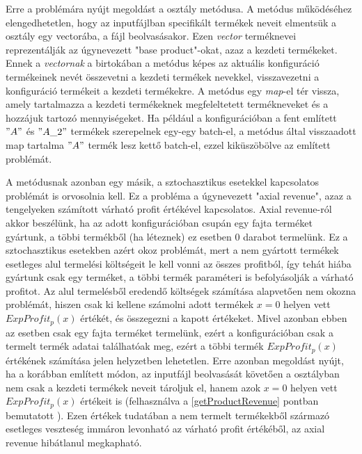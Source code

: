 Erre a problémára nyújt megoldást a  osztály  metódusa.
A metódus működéséhez elengedhetetlen, hogy az inputfájlban specifikált termékek neveit elmentsük a  osztály egy vectorába, a fájl beolvasásakor.
Ezen \textit{vector} terméknevei reprezentálják az úgynevezett "base product"-okat, azaz a kezdeti termékeket.
Ennek a \textit{vectornak} a birtokában a  metódus képes az aktuális konfiguráció termékeinek nevét összevetni a kezdeti termékek nevekkel, visszavezetni a konfiguráció termékeit a kezdeti termékekre.
A metódus egy \textit{map}-el tér vissza, amely tartalmazza a kezdeti termékeknek megfeleltetett termékneveket és a hozzájuk tartozó mennyiségeket.
Ha például a konfigurációban a fent említett $"A"$ és $"A\_2"$ termékek szerepelnek egy-egy batch-el, a metódus által visszaadott map tartalma $"A"$ termék lesz kettő batch-el, ezzel kiküszöbölve az említett problémát.

A  metódusnak azonban egy másik, a sztochasztikus esetekkel kapcsolatos problémát is orvosolnia kell.
Ez a probléma a úgynevezett "axial revenue", azaz a tengelyeken számított várható profit értékével kapcsolatos.
Axial revenue-ról akkor beszélünk, ha az adott konfigurációban csupán egy fajta terméket gyártunk, a többi termékből (ha léteznek) ez esetben 0 darabot termelünk.
Ez a sztochasztikus esetekben azért okoz problémát, mert a nem gyártott termékek esetleges alul termelési költségeit le kell vonni az összes profitból, így tehát hiába gyártunk csak egy terméket, a többi termék paraméteri is befolyásolják a várható profitot.
Az alul termelésből eredendő költségek számítása alapvetően nem okozna problémát, hiszen csak ki kellene számolni adott termékek $x=0$ helyen vett $ExpProfit_p(x)$ értékét, és összegezni a kapott értékeket.
Mivel azonban ebben az esetben csak egy fajta terméket termelünk, ezért a konfigurációban csak a termelt termék adatai találhatóak meg, ezért a többi termék $ExpProfit_p(x)$ értékének számítása jelen helyzetben lehetetlen.
Erre azonban megoldást nyújt, ha a korábban említett módon, az inputfájl beolvasását követően a  osztályban nem csak a kezdeti termékek neveit tároljuk el, hanem azok $x=0$ helyen vett $ExpProfit_p(x)$ értékeit is (felhasználva a \ref{getProductRevenue} pontban bemutatott ).
Ezen értékek tudatában a nem termelt termékekből származó esetleges veszteség immáron levonható az várható profit értékéből, az axial revenue hibátlanul megkapható.


